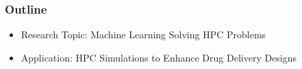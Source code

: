 \begin{frame}
\frametitle{Outline}
    \begin{itemize}
        \item Research Topic: Machine Learning Solving HPC Problems
        \item Application: HPC Simulations to Enhance Drug Delivery Designs
    \end{itemize}
\end{frame}
